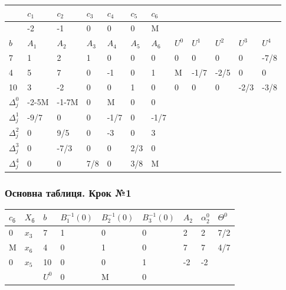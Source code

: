 \documentclass[a4paper, 12pt]{article}
\begin{document}
\begin{table}[H]
    \centering
    \begin{tabular}{|l|l|l|l|l|l|l|l|l|l|l|l|}
    \hline
         & $c_1$ & $c_2$ & $c_3$ & $c_4$ & $c_5$ & $c_6$ & & & & & \\ \hline
         & -2 & -1 & 0 & 0 & 0 & M & & & & & \\ \hline
         $b$ & $A_1$ & $A_2$ & $A_3$ & $A_4$ & $A_5$ & $A_6$ & $U^{0}$ & $U^{1}$ & $U^{2}$ & $U^{3}$ & $U^{4}$ \\ \hline
        7 & 1 & 2 & 1 & 0 & 0 & 0 & 0 & 0 & 0 & 0 & -7/8 \\ \hline
        4 & 5 & 7 & 0 & -1 & 0 & 1 & M & -1/7 & -2/5 & 0 & 0 \\ \hline
        10 & 3 & -2 & 0 & 0 & 1 & 0 & 0 & 0 & 0 & -2/3 & -3/8 \\ \hline
        $\Delta_{j}^{0}$ & -2-5M & -1-7M & 0 & M & 0 & 0 & & & & & \\ \hline
        $\Delta_{j}^{1}$ & -9/7 & 0 & 0 & -1/7 & 0 & -1/7 & & & & & \\ \hline
        $\Delta_{j}^{2}$ & 0 & 9/5 & 0 & -3 & 0 & 3 & & & & & \\ \hline
        $\Delta_{j}^{3}$ & 0 & -7/3 & 0 & 0 & 2/3 & 0 & & & & & \\ \hline
        $\Delta_{j}^{4}$ & 0 & 0 & 7/8 & 0 & 3/8 & M & & & & & \\ \hline
    \end{tabular}
\end{table}


\subsubsection{Основна таблиця. Крок №1}

\begin{table}[H]
    \centering
    \begin{tabular}{|l|l|l|l|l|l|l|l|l|}
    \hline
         $c_\text{б}$ & $X_\text{б}$ & $b$ & $B_{1}^{-1}(0)$ & $B_{2}^{-1}(0)$ & $B_{3}^{-1}(0)$ & $A_{2}$ & $\alpha_{2}^{0}$  & $\Theta^{0}$ \\ \hline
        0 & $x_3$ & 7 & 1 & 0 & 0 & 2 & 2 & 7/2 \\ \hline
        M & $x_6$ & 4 & 0 & 1 & 0 & 7 & 7 & 4/7 \\ \hline
        0 & $x_5$ & 10 & 0 & 0 & 1 & -2 & -2 &  \\ \hline
        & & $U^{0}$ & 0 & M & 0 & & &  \\ \hline
    \end{tabular}
\end{table}
\end{document}
